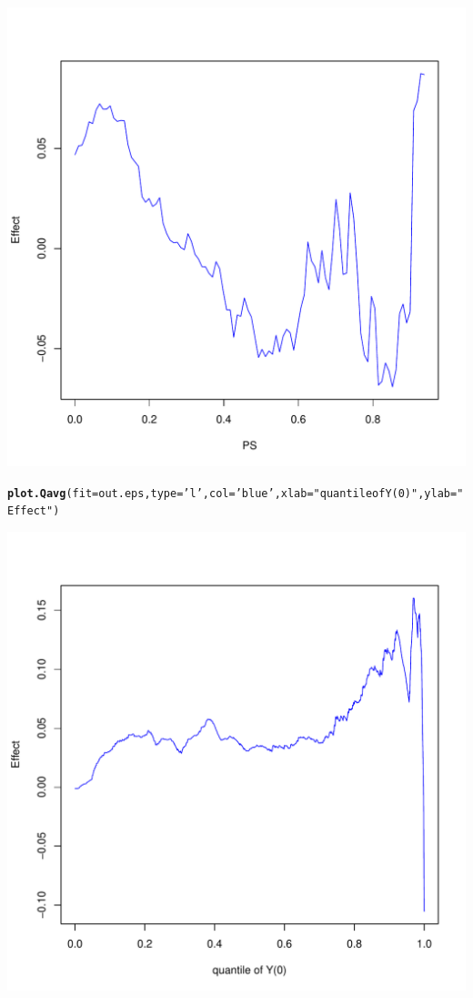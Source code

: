\documentclass{article}\usepackage[]{graphicx}\usepackage[]{color}
\makeatletter
\def\maxwidth{ %
  \ifdim\Gin@nat@width>\linewidth
    \linewidth
  \else
    \Gin@nat@width
  \fi
}
\newcommand{\hlstr}[1]{\textcolor[rgb]{0.192,0.494,0.8}{#1}}%
\newcommand{\hlstd}[1]{\textcolor[rgb]{0.345,0.345,0.345}{#1}}%
\newcommand{\hlkwc}[1]{\textcolor[rgb]{0.333,0.667,0.333}{#1}}%
\newcommand{\hlkwd}[1]{\textcolor[rgb]{0.737,0.353,0.396}{\textbf{#1}}}%
\newenvironment{kframe}{%
 \def\at@end@of@kframe{}%
 \ifinner\ifhmode%
  \def\at@end@of@kframe{\end{minipage}}%
  \begin{minipage}{\columnwidth}%
 \fi\fi%
 \def\FrameCommand##1{\hskip\@totalleftmargin \hskip-\fboxsep
 \colorbox{shadecolor}{##1}\hskip-\fboxsep
     \hskip-\linewidth \hskip-\@totalleftmargin \hskip\columnwidth}%
 \MakeFramed {\advance\hsize-\width
   \@totalleftmargin\z@ \linewidth\hsize
   \@setminipage}}%
 {\par\unskip\endMakeFramed%
 \at@end@of@kframe}
\newenvironment{knitrout}{}{} %
\makeatother
\begin{document}
\begin{knitrout}
{\centering \includegraphics[width=\maxwidth]{figures/EPS-heatmap-2} 

}


\begin{kframe}\begin{alltt}
\hlkwd{plot.Qavg}\hlstd{(}\hlkwc{fit}\hlstd{=out.eps  ,} \hlkwc{type}\hlstd{=}\hlstr{'l'} \hlstd{,} \hlkwc{col}\hlstd{=}\hlstr{'blue'} \hlstd{,} \hlkwc{xlab}\hlstd{=}\hlstr{"quantile of Y(0)"} \hlstd{,} \hlkwc{ylab}\hlstd{=}\hlstr{"Effect"}\hlstd{)}
\end{alltt}
\end{kframe}

{\centering \includegraphics[width=\maxwidth]{figures/EPS-heatmap-3} 

}



\end{knitrout}
\end{document}
